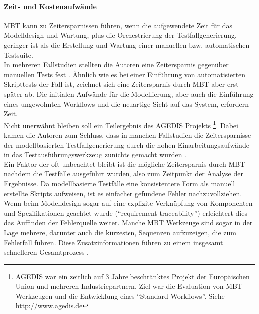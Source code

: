 \paragraph{Zeit- und Kostenaufwände} \Gls{MBT} kann zu Zeitersparnissen führen, wenn die aufgewendete Zeit für das Modelldesign und Wartung, plus die Orchestrierung der Testfallgenerierung, geringer ist als die Erstellung und Wartung einer manuellen bzw. automatischen Testsuite.\\
In mehreren Fallstudien stellten die Autoren eine Zeitersparnis gegenüber manuellen Tests fest \cite{farchi_using_2002} \cite{prenninger_mbt_2005} \cite{pretschner_one_2005}. Ähnlich wie es bei einer Einführung von automatisierten Skripttests der Fall ist, zeichnet sich eine Zeitersparnis durch \Gls{MBT} aber erst später ab. Die initialen Aufwände für die Modellierung, aber auch die Einführung eines ungewohnten Workflows und die neuartige Sicht auf das System, erfordern Zeit.\\
Nicht unerwähnt bleiben soll ein Teilergebnis des AGEDIS Projekts \footnote{AGEDIS war ein zeitlich auf 3 Jahre beschränktes Projekt der Europäischen Union und mehreren Industriepartnern. Ziel war die Evaluation von \Gls{MBT} Werkzeugen und die Entwicklung eines ``Standard-Workflows''. Siehe \url{http://www.agedis.de}}. Dabei kamen die Autoren zum Schluss, dass in manchen Fallstudien die Zeitersparnisse der modellbasierten Testfallgenerierung durch die hohen Einarbeitungsaufwände in das Testausführungswerkzeug zunichte gemacht wurden \cite{craggs_agedis_2003}.\\
Ein Faktor der oft unbeachtet bleibt ist die mögliche Zeitersparnis durch \Gls{MBT} nachdem die Testfälle ausgeführt wurden, also zum Zeitpunkt der Analyse der Ergebnisse. Da modellbasierte Testfälle eine konsistentere Form als manuell erstellte Skripts aufweisen, ist es einfacher gefundene Fehler nachzuvollziehen. Wenn beim Modelldesign sogar auf eine explizite Verknüpfung von Komponenten und Spezifikationen geachtet wurde (``requirement traceability'') erleichtert dies das Auffinden der Fehlerquelle weiter. Manche \Gls{MBT} Werkzeuge sind sogar in der Lage mehrere, darunter auch die kürzesten, Sequenzen aufzuzeigen, die zum Fehlerfall führen. Diese Zusatzinformationen führen zu einem insgesamt schnelleren Gesamtprozess \cite{utting_practical_2007}.

